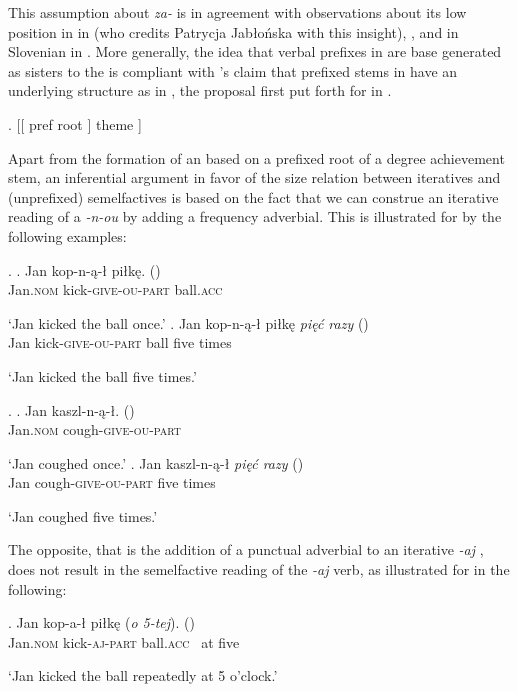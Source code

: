 This assumption about \textit{za-} is in agreement with observations about its low position in  in \cite{Sven2004} (who credits Patrycja Jab\l{}o\'nska with this insight), \cite{Wiland2012}, and in Slovenian in \cite{Zaucer2005}. More generally, the idea that verbal prefixes in  are base generated as sisters to the  is compliant with \citeauthor{Caha-Zikova}'s \citeyearpar{Caha-Zikova} claim that prefixed  stems in  have an underlying structure as in \Next, the proposal first put forth for  in \cite{Sven2004b}.

\ex. [[ pref root ] theme ]  

Apart from the formation of an  based on a prefixed root of a  degree achievement stem, an inferential argument in favor of the size relation between iteratives and (unprefixed) semelfactives 	
is based on the fact that we can construe an iterative reading of a  \textit{-n-ou}  by adding a frequency adverbial. 
This is illustrated for  by the following examples:

\ex. 
\ag. 	Jan kop-n-\k{a}-\l {} pi\l k\k{e}. \hskip 0.35cm ()\\
	Jan.\textsc{nom} kick-\textsc{give-ou-part} ball.\textsc{acc}\\
	\strut `Jan kicked the ball once.'
\bg. 	Jan kop-n-\k{a}-\l {} pi\l k\k{e} \textit{pi\k{e}\'c razy} () \\
	Jan kick-\textsc{give-ou-part} ball {five times}\\
	\strut `Jan kicked the ball five times.'

\ex. 
\ag. 	Jan kaszl-n-\k{a}-\l. \hskip 0.8cm ()\\
	Jan.\textsc{nom} cough-\textsc{give-ou-part}\\
	\strut `Jan coughed once.'
\bg. 	Jan kaszl-n-\k{a}-\l {} \textit{pi\k{e}\'c razy} () \\
	Jan cough-\textsc{give-ou-part} {five times}\\
	\strut `Jan coughed five times.'

The opposite, that is the addition of a punctual adverbial to an iterative \textit{-aj} , does not result in the  semelfactive reading of the \textit{-aj} verb, as illustrated for  in the following:

\exg. Jan kop-{a}-\l {} pi\l k\k{e} (\textit{o 5-tej}). \hskip 0.25cm ()\\
	Jan.\textsc{nom} kick-\textsc{aj-part} ball.\textsc{acc} { \ at five}\\
	\strut `Jan kicked the ball repeatedly at 5 o'clock.'
	
